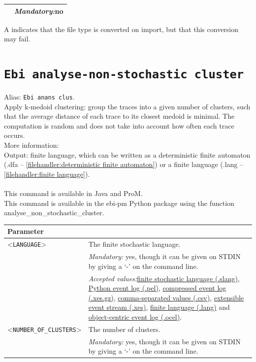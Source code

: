 {\begin{tabularx}{\linewidth}{lX}
&\textit{Mandatory:}\quad no\\
\bottomrule
\end{tabularx}
A \textdagger{} indicates that the file type is converted on import, but that this conversion may fail.
\clearpage\section{\texttt{Ebi analyse-non-stochastic cluster}}
\label{command:Ebi analyse-non-stochastic cluster}
Alias: \texttt{Ebi anans clus}.\\
Apply k-medoid clustering: group the traces into a given number of clusters, such that the average distance of each trace to its closest medoid is minimal. The computation is random and does not take into account how often each trace occurs.\\
More information: ~\cite{DBLP:journals/is/SchubertR21}~\\
\noindent Output: finite language, which can be written as a deterministic finite automaton (.dfa -- \cref{filehandler:deterministic finite automaton}) or a finite language (.lang -- \cref{filehandler:finite language}).\\
\\This command is available in Java and ProM.
\\This command is available in the ebi-pm Python package using the function analyse\_non\_stochastic\_cluster.
\begin{tabularx}{\linewidth}{lX}
\toprule
Parameter \\\midrule
<\texttt{LANGUAGE}>&The finite stochastic language.\\
&\textit{Mandatory:} \quad yes, though it can be given on STDIN by giving a `-' on the command line.\\
&\textit{Accepted values:}\quad \hyperref[filehandler:finite stochastic language]{finite stochastic language (.slang)}, \hyperref[filehandler:Python event log]{Python event log (.pel)}, \hyperref[filehandler:compressed event log]{compressed event log (.xes.gz)}, \hyperref[filehandler:comma-separated values]{comma-separated values (.csv)}, \hyperref[filehandler:extensible event stream]{extensible event stream (.xes)}, \hyperref[filehandler:finite language]{finite language (.lang)} and \hyperref[filehandler:object-centric event log]{object-centric event log (.ocel)}.\\
<\texttt{NUMBER\_OF\_CLUSTERS}>&The number of clusters.\\
&\textit{Mandatory:} \quad yes, though it can be given on STDIN by giving a `-' on the command line.\\

\end{tabularx}}

